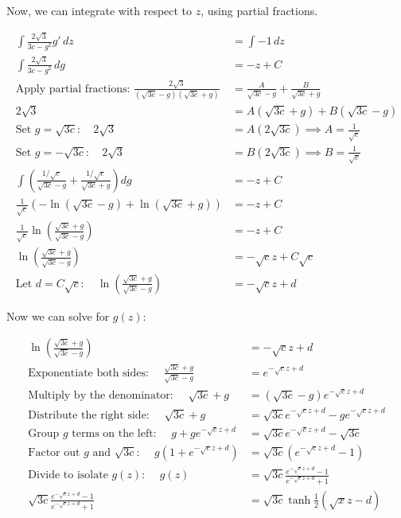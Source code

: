 \documentclass[12pt, letterpaper]{article}
\begin{document}
    Now, we can integrate with respect to $z$, using partial fractions.

    \begin{align*}
        \int \frac{2 \sqrt{3}}{3c-g^2} g' \, dz &= \int -1 \, dz \\
        \int \frac{2 \sqrt{3}}{3c-g^2} \, dg &= -z + C \\
        \text{Apply partial fractions: } \frac{2 \sqrt{3}}{(\sqrt{3c} - g)(\sqrt{3c} + g)} &= \frac{A}{\sqrt{3c} - g} + \frac{B}{\sqrt{3c} + g} \\
        2 \sqrt{3} &= A(\sqrt{3c} + g) + B(\sqrt{3c} - g) \\
        \text{Set } g = \sqrt{3c}: \quad 2\sqrt{3} &= A(2\sqrt{3c}) \implies A = \frac{1}{\sqrt{c}} \\
        \text{Set } g = -\sqrt{3c}: \quad 2\sqrt{3} &= B(2\sqrt{3c}) \implies B = \frac{1}{\sqrt{c}} \\
        \int \left( \frac{1/\sqrt{c}}{\sqrt{3c} - g} + \frac{1/\sqrt{c}}{\sqrt{3c} + g} \right) dg &= -z + C \\
        \frac{1}{\sqrt{c}} \left( -\ln(\sqrt{3c} - g) + \ln(\sqrt{3c} + g) \right) &= -z + C \\
        \frac{1}{\sqrt{c}} \ln \left( \frac{\sqrt{3c} + g}{\sqrt{3c} - g} \right) &= -z + C \\
        \ln \left( \frac{\sqrt{3c} + g}{\sqrt{3c} - g} \right) &= -\sqrt{c}z + C\sqrt{c} \\
        \text{Let } d = C\sqrt{c}: \quad \ln \left( \frac{\sqrt{3c} + g}{\sqrt{3c} - g} \right) &= -\sqrt{c}z + d
    \end{align*}

    Now we can solve for $g(z)$:

    \begin{align*}
        \ln \left( \frac{\sqrt{3c} + g}{\sqrt{3c} - g} \right) &= -\sqrt{c}z + d \\
        \text{Exponentiate both sides: } \quad \frac{\sqrt{3c} + g}{\sqrt{3c} - g} &= e^{-\sqrt{c}z + d} \\
        \text{Multiply by the denominator: } \quad \sqrt{3c} + g &= (\sqrt{3c} - g) e^{-\sqrt{c}z + d} \\
        \text{Distribute the right side: } \quad \sqrt{3c} + g &= \sqrt{3c} e^{-\sqrt{c}z + d} - g e^{-\sqrt{c}z + d} \\
        \text{Group } g \text{ terms on the left: } \quad g + g e^{-\sqrt{c}z + d} &= \sqrt{3c} e^{-\sqrt{c}z + d} - \sqrt{3c} \\
        \text{Factor out } g \text{ and } \sqrt{3c}\text{: } \quad g(1 + e^{-\sqrt{c}z + d}) &= \sqrt{3c} (e^{-\sqrt{c}z + d} - 1) \\
        \text{Divide to isolate } g(z)\text{: } \quad g(z) &= \sqrt{3c} \frac{e^{-\sqrt{c}z + d} - 1}{e^{-\sqrt{c}z + d} + 1} \\
        \sqrt{3c} \frac{e^{-\sqrt{c}z + d} - 1}{e^{-\sqrt{c}z + d} + 1} &= \sqrt{3c} \tanh{\frac{1}{2} (\sqrt{x}z-d)}
    \end{align*}
\end{document}
